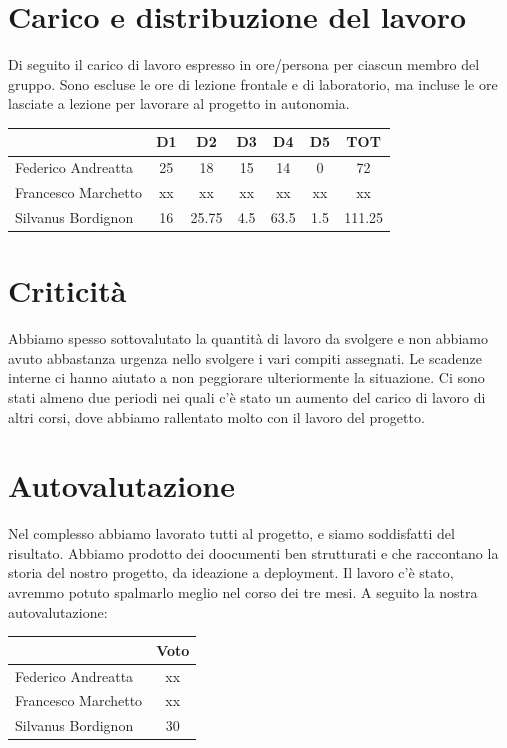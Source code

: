 \documentclass[a4paper,12pt]{article}
\begin{document}
\section{Carico e distribuzione del lavoro}

Di seguito il carico di lavoro espresso in ore/persona per ciascun membro del gruppo. Sono escluse le ore di lezione frontale e di laboratorio, ma incluse le ore lasciate a lezione per lavorare al progetto in autonomia.

\begin{tabular}{|l|c|c|c|c|c|c|}
    \hline
    & \textbf{D1} & \textbf{D2} & \textbf{D3} & \textbf{D4} & \textbf{D5} & \textbf{TOT} \\ \hline
    Federico Andreatta & 25 & 18 & 15 & 14 & 0 & 72 \\ \hline
    Francesco Marchetto & xx & xx & xx & xx & xx & xx \\ \hline
    Silvanus Bordignon & 16 & 25.75 & 4.5 & 63.5 & 1.5 & 111.25 \\ \hline
\end{tabular}

\section{Criticità}

Abbiamo spesso sottovalutato la quantità di lavoro da svolgere e non abbiamo avuto abbastanza urgenza nello svolgere i vari compiti assegnati. Le scadenze interne ci hanno aiutato a non peggiorare ulteriormente la situazione. Ci sono stati almeno due periodi nei quali c'è stato un aumento del carico di lavoro di altri corsi, dove abbiamo rallentato molto con il lavoro del progetto.

\section{Autovalutazione}

Nel complesso abbiamo lavorato tutti al progetto, e siamo soddisfatti del risultato. Abbiamo prodotto dei doocumenti ben strutturati e che raccontano la storia del nostro progetto, da ideazione a deployment. Il lavoro c'è stato, avremmo potuto spalmarlo meglio nel corso dei tre mesi. A seguito la nostra autovalutazione:

\begin{tabular}{|l|c|}
    \hline
    & Voto \\ \hline
    Federico Andreatta & xx \\ \hline
    Francesco Marchetto & xx \\ \hline
    Silvanus Bordignon & 30 \\ \hline
\end{tabular}
\end{document}
